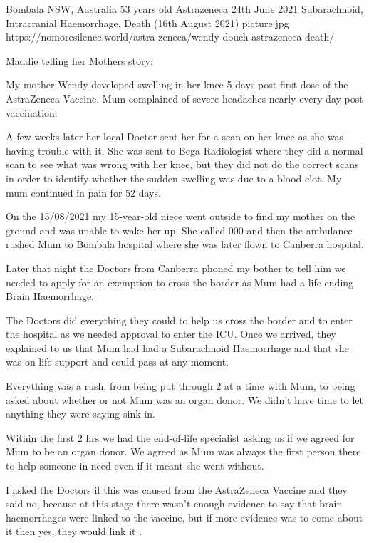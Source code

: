 {Bombala NSW, Australia}
{53 years old}
{Astrazeneca}
{24th June 2021}
{Subarachnoid, Intracranial Haemorrhage, Death (16th August 2021)}
{picture.jpg}
{https://nomoresilence.world/astra-zeneca/wendy-douch-astrazeneca-death/}
{

\normalsize

Maddie telling her Mothers story:

My mother Wendy developed swelling in her knee 5 days post first dose of the
AstraZeneca Vaccine. Mum complained of severe headaches nearly every day post
vaccination.

A few weeks later her local Doctor sent her for a scan on her knee as she was
having trouble with it. She was sent to Bega Radiologist where they did a normal
scan to see what was wrong with her knee, but they did not do the correct scans
in order to identify whether the sudden swelling was due to a blood clot. My mum
continued in pain for 52 days.

On the 15/08/2021 my 15-year-old niece went outside to find my mother on the
ground and was unable to wake her up. She called 000 and then the ambulance
rushed Mum to Bombala hospital where she was later flown to Canberra hospital.

Later that night the Doctors from Canberra phoned my bother to tell him we
needed to apply for an exemption to cross the border as Mum had a life ending
Brain Haemorrhage.

The Doctors did everything they could to help us cross the border and to enter
the hospital as we needed approval to enter the ICU. Once we arrived, they
explained to us that Mum had had a Subarachnoid Haemorrhage and that she was on
life support and could pass at any moment.

Everything was a rush, from being put through 2 at a time with Mum, to being
asked about whether or not Mum was an organ donor. We didn’t have time to let
anything they were saying sink in.

Within the first 2 hrs we had the end-of-life specialist asking us if we agreed
for Mum to be an organ donor. We agreed as Mum was always the first person there
to help someone in need even if it meant she went without.

I asked the Doctors if this was caused from the AstraZeneca Vaccine and they
said no, because at this stage there wasn’t enough evidence to say that brain
haemorrhages were linked to the vaccine, but if more evidence was to come about
it then yes, they would link it .

}

